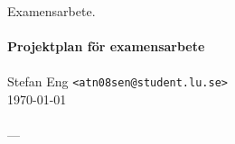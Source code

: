 \documentclass{article}
\begin{document}
\begin{center}

%
%
%
%

  Examensarbete. \\
  \ \\
  {\large
    \textbf{Projektplan för examensarbete}
  } \\
  \ \\
  Stefan Eng \texttt{<atn08sen@student.lu.se>}
  \ \\
  \today \\
  \ \\
  ---
  \vspace{-0.3cm}

\end{center}
\end{document}
